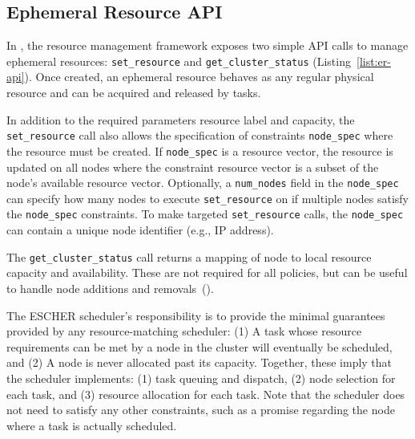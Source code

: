 \subsection{Ephemeral Resource API}
\label{sec:arch:api}

\begin{sloppypar}
In \name{}, the resource management framework exposes two simple API calls to manage ephemeral resources: \lstinline{set_resource} and \lstinline{get_cluster_status} (Listing~\ref{list:er-api}). Once created, an ephemeral resource behaves as any regular physical resource and can be acquired and released by tasks.
\end{sloppypar}

In addition to the required parameters resource label and capacity, the \lstinline{set_resource} call also allows the specification of constraints \lstinline{node_spec} where the resource must be created. If \lstinline{node_spec} is a resource vector, the resource is updated on all nodes where the constraint resource vector is a subset of the node's available resource vector.
Optionally, a \lstinline{num_nodes} field in the \lstinline{node_spec} can specify how many nodes to execute \lstinline{set_resource} on if multiple nodes satisfy the \lstinline{node_spec} constraints.
To make targeted \lstinline{set_resource} calls, the \lstinline{node_spec} can contain a unique node identifier (e.g., IP address).

The \lstinline{get_cluster_status} call returns a mapping of node to local resource capacity and availability.
These are not required for all policies, but can be useful to handle node additions and removals~().

The ESCHER scheduler's responsibility is to provide the minimal guarantees provided by any resource-matching scheduler: (1) A task whose resource requirements can be met by a node in the cluster will eventually be scheduled, and (2) A node is never allocated past its capacity.
Together, these imply that the scheduler implements: (1) task queuing and dispatch, (2) node selection for each task, and (3) resource allocation for each task.
Note that the scheduler does not need to satisfy any other constraints, such as a promise regarding the node where a task is actually scheduled.



